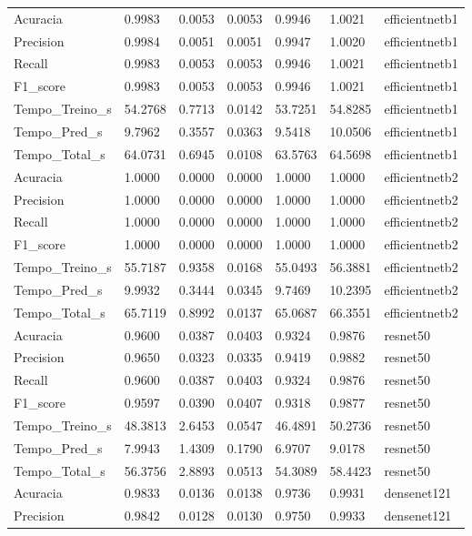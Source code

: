 \begin{tabular}{lllllll}
Acuracia & 0.9983 & 0.0053 & 0.0053 & 0.9946 & 1.0021 & efficientnetb1 \\
Precision & 0.9984 & 0.0051 & 0.0051 & 0.9947 & 1.0020 & efficientnetb1 \\
Recall & 0.9983 & 0.0053 & 0.0053 & 0.9946 & 1.0021 & efficientnetb1 \\
F1_score & 0.9983 & 0.0053 & 0.0053 & 0.9946 & 1.0021 & efficientnetb1 \\
Tempo_Treino_s & 54.2768 & 0.7713 & 0.0142 & 53.7251 & 54.8285 & efficientnetb1 \\
Tempo_Pred_s & 9.7962 & 0.3557 & 0.0363 & 9.5418 & 10.0506 & efficientnetb1 \\
Tempo_Total_s & 64.0731 & 0.6945 & 0.0108 & 63.5763 & 64.5698 & efficientnetb1 \\
Acuracia & 1.0000 & 0.0000 & 0.0000 & 1.0000 & 1.0000 & efficientnetb2 \\
Precision & 1.0000 & 0.0000 & 0.0000 & 1.0000 & 1.0000 & efficientnetb2 \\
Recall & 1.0000 & 0.0000 & 0.0000 & 1.0000 & 1.0000 & efficientnetb2 \\
F1_score & 1.0000 & 0.0000 & 0.0000 & 1.0000 & 1.0000 & efficientnetb2 \\
Tempo_Treino_s & 55.7187 & 0.9358 & 0.0168 & 55.0493 & 56.3881 & efficientnetb2 \\
Tempo_Pred_s & 9.9932 & 0.3444 & 0.0345 & 9.7469 & 10.2395 & efficientnetb2 \\
Tempo_Total_s & 65.7119 & 0.8992 & 0.0137 & 65.0687 & 66.3551 & efficientnetb2 \\
Acuracia & 0.9600 & 0.0387 & 0.0403 & 0.9324 & 0.9876 & resnet50 \\
Precision & 0.9650 & 0.0323 & 0.0335 & 0.9419 & 0.9882 & resnet50 \\
Recall & 0.9600 & 0.0387 & 0.0403 & 0.9324 & 0.9876 & resnet50 \\
F1_score & 0.9597 & 0.0390 & 0.0407 & 0.9318 & 0.9877 & resnet50 \\
Tempo_Treino_s & 48.3813 & 2.6453 & 0.0547 & 46.4891 & 50.2736 & resnet50 \\
Tempo_Pred_s & 7.9943 & 1.4309 & 0.1790 & 6.9707 & 9.0178 & resnet50 \\
Tempo_Total_s & 56.3756 & 2.8893 & 0.0513 & 54.3089 & 58.4423 & resnet50 \\
Acuracia & 0.9833 & 0.0136 & 0.0138 & 0.9736 & 0.9931 & densenet121 \\
Precision & 0.9842 & 0.0128 & 0.0130 & 0.9750 & 0.9933 & densenet121 \\

\end{tabular}
